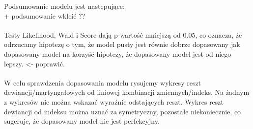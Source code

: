 \documentclass[10pt]{article}
\begin{document}
Podsumowanie modelu jest następujące:\\
+ podsumowanie wkleić ??\\\\
Testy Likelihood, Wald i Score dają p-wartość mniejszą od 0.05, co oznacza, że odrzucamy hipotezę o tym, że model pusty jest równie dobrze dopasowany jak dopasowany model na korzyść hipotezy, że dopasowany model jest od niego lepszy. <- poprawić. \\\\
W celu sprawdzenia  dopasowania modelu rysujemy wykresy reszt dewiancji/martyngałowych od liniowej kombinacji zmiennych/indeks.  
Na żadnym z wykresów nie można wskazać wyraźnie odstających reszt. Wykres reszt dewiancji od indeksu można uznać za symetryczny, pozostałe niekoniecznie, co sugeruje, że dopasowany model nie jest perfekcyjny. 
\end{document}
